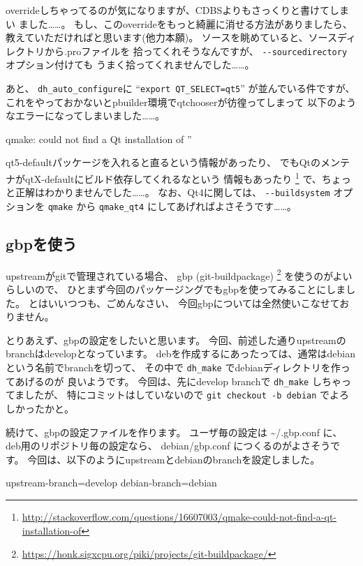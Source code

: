 \documentclass[mingoth,a4paper]{jsarticle}
\begin{document}
overrideしちゃってるのが気になりますが、CDBSよりもさっくりと書けてしまい
ました……。
もし、このoverrideをもっと綺麗に消せる方法がありましたら、
教えていただければと思います(他力本願)。
ソースを眺めていると、ソースディレクトリから.proファイルを
拾ってくれそうなんですが、 \verb|--sourcedirectory| オプション付けても
うまく拾ってくれませんでした……。

あと、 \verb|dh_auto_configure|に ``\verb|export QT_SELECT=qt5|''
が並んでいる件ですが、
これをやっておかないとpbuilder環境でqtchooserが彷徨ってしまって
以下のようなエラーになってしまいました……。
 \begin{commandline}
  qmake: could not find a Qt installation of ''
 \end{commandline}
qt5-defaultパッケージを入れると直るという情報があったり、
でもQtのメンテナがqtX-defaultにビルド依存してくれるなという
情報もあったり
\footnote{\url{http://stackoverflow.com/questions/16607003/qmake-could-not-find-a-qt-installation-of}}
で、ちょっと正解はわかりませんでした……。
なお、Qt4に関しては、 \verb|--buildsystem| オプションを \verb|qmake| から
\verb|qmake_qt4| にしてあげればよさそうです……。


\subsection{gbpを使う}

upstreamがgitで管理されている場合、
gbp (git-buildpackage)
\footnote{\url{https://honk.sigxcpu.org/piki/projects/git-buildpackage/}}
を使うのがよいらしいので、
ひとまず今回のパッケージングでもgbpを使ってみることにしました。
とはいいつつも、ごめんなさい、
今回gbpについては全然使いこなせておりません。

とりあえず、gbpの設定をしたいと思います。
今回、前述した通りupstreamのbranchはdevelopとなっています。
debを作成するにあったっては、通常はdebianという名前でbranchを切って、
その中で \verb|dh_make| でdebianディレクトリを作ってあげるのが
良いようです。
今回は、先にdevelop branchで \verb|dh_make| しちゃってましたが、
特にコミットはしていないので \verb|git checkout -b debian|
でよろしかったかと。

続けて、gbpの設定ファイルを作ります。
ユーザ毎の設定は \~{}/.gbp.conf に、
deb用のリポジトリ毎の設定なら、 debian/gbp.conf につくるのがよさそうです。
今回は、以下のようにupstreamとdebianのbranchを設定しました。

\begin{commandline}
[DEFAULT]
upstream-branch=develop
debian-branch=debian
\end{commandline}
\end{document}
